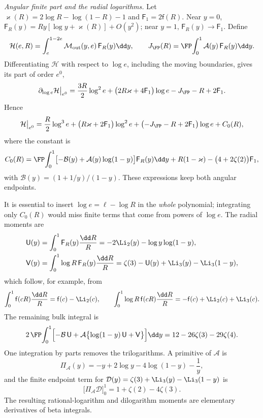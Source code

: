 \emph{Angular finite part and the radial logarithms.} Let $\varkappa(R)=2\log R-\log(1-R)-1$ and
$\mathsf F_1=2\mathsf f(R)$. Near $y=0$, $\mathsf F_R(y)=Ry[\log y+\varkappa(R)]+O(y^2)$; near $y=1$,
$\mathsf F_R(y)\to\mathsf F_1$. Define
\begin{equation}
 \mathcal H(e,R)=\int_e^{1-2e}\mathcal M_{\rm out}(y,e)\,\mathsf F_R(y)\dd y,\qquad
 J_{\FP}(R)=\FP\!\int_0^1\mathcal A(y)\,\mathsf F_R(y)\dd y.
\end{equation}
Differentiating $\mathcal H$ with respect to $\log e$, including the moving boundaries, gives its part of order $e^0$,
\begin{equation}
 \partial_{\log e}\mathcal H\big|_{e^0}=\frac{3R}{2}\log^2e+\bigl(2R\varkappa+4\mathsf F_1\bigr)\log e-J_{\FP}-R
 +2\mathsf F_1.
\end{equation}
Hence
\begin{equation}
 \mathcal H\big|_{e^0}=\frac R2\log^3e+\bigl(R\varkappa+2\mathsf F_1\bigr)\log^2e+\bigl(-J_{\FP}-R+2\mathsf F_1\bigr)\log e
 +C_0(R),
\end{equation}
where the constant is
\begin{equation}
 C_0(R)=\FP\!\int_0^1\bigl[-\mathcal B(y)+\mathcal A(y)\log(1-y)\bigr]\mathsf F_R(y)\dd y+R(1-\varkappa)
 -\bigl(4+2\zeta(2)\bigr)\mathsf F_1,
\end{equation}
with $\mathcal B(y)=(1+1/y)/(1-y)$. These expressions keep both angular endpoints.

It is essential to insert $\log e=\ell-\log R$ in the \emph{whole} polynomial; integrating only $C_0(R)$ would miss
finite terms that come from powers of $\log e$. The radial moments are
\begin{equation}
\begin{aligned}
 \mathsf U(y)&=\int_0^1\mathsf F_R(y)\frac{\dd R}{R}=-2\Li_2(y)-\log y\log(1-y),\\
 \mathsf V(y)&=\int_0^1\log R\,\mathsf F_R(y)\frac{\dd R}{R}=\zeta(3)-\mathsf U(y)+\Li_3(y)-\Li_3(1-y),
\end{aligned}
\end{equation}
which follow, for example, from
\begin{equation}
 \int_0^1\mathsf f(cR)\frac{\dd R}{R}=\mathsf f(c)-\Li_2(c),\qquad
 \int_0^1\log R\,\mathsf f(cR)\frac{\dd R}{R}=-\mathsf f(c)+\Li_2(c)+\Li_3(c).
\end{equation}
The remaining bulk integral is
\begin{equation}
 2\,\FP\!\int_0^1\Bigl[-\mathcal B\,\mathsf U+\mathcal A\bigl\{\log(1-y)\,\mathsf U+\mathsf V\bigr\}\Bigr]\dd y
 =12-26\zeta(3)-29\zeta(4).
 \label{sri:eq:dualB:ep4bulk}
\end{equation}
One integration by parts removes the trilogarithms. A primitive of $\mathcal A$ is
\begin{equation}
 \Pi_{\mathcal A}(y)=-y+2\log y-4\log(1-y)-\frac1y,
\end{equation}
and the finite endpoint term for $\mathcal D(y)=\zeta(3)+\Li_3(y)-\Li_3(1-y)$ is
\begin{equation}
 \bigl[\Pi_{\mathcal A}\mathcal D\bigr]_0^1=1+\zeta(2)-4\zeta(3).
\end{equation}
The resulting rational-logarithm and dilogarithm moments are elementary derivatives of beta integrals.

